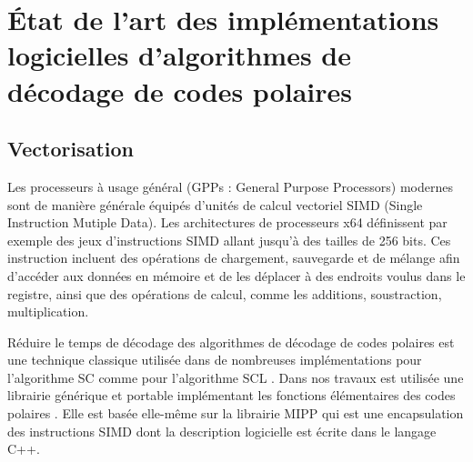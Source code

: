 \section{\'Etat de l'art des implémentations logicielles d'algorithmes de décodage de codes polaires}
\label{sec:art_scl}

\subsection{Vectorisation}
Les processeurs à usage général (GPPs : General Purpose Processors) modernes sont de manière générale équipés d'unités de calcul vectoriel SIMD (Single Instruction Mutiple Data). Les architectures de processeurs x64 définissent par exemple des jeux d'instructions SIMD allant jusqu'à des tailles de 256 bits. Ces instruction incluent des opérations de chargement, sauvegarde et de mélange afin d'accéder aux données en mémoire et de les déplacer à des endroits voulus dans le registre, ainsi que des opérations de calcul, comme les additions, soustraction, multiplication.

Réduire le temps de décodage des algorithmes de décodage de codes polaires est une technique classique utilisée dans de nombreuses implémentations pour l'algorithme SC \cite{giard_fast_2014,giard_low-latency_2016,sarkis_fast_2014,sarkis_autogenerating_2014,giard_low-latency_2016,gal_software_2014,cassagne_efficient_2015,cassagne_energy_2016} comme pour l'algorithme SCL \cite{sarkis_increasing_2014,sarkis_fast_2016,shen_low-latency_2016}. Dans nos travaux est utilisée une librairie générique et portable implémentant les fonctions élémentaires des codes polaires \cite{cassagne_efficient_2015}. Elle est basée elle-même sur la librairie MIPP \cite{cassagne2018mipp} qui est une encapsulation des instructions SIMD dont la description logicielle est écrite dans le langage C++.

  \lstset{linewidth=0.7\textwidth, xleftmargin=0.025\textwidth, xrightmargin=0.05\textwidth}

